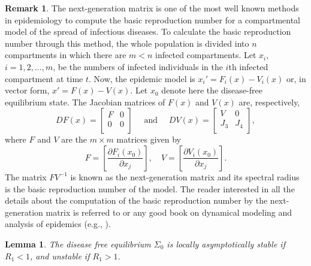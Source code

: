 \documentclass{my_aims}
\newtheorem{lemma}[theorem]{Lemma}
\theoremstyle{definition}
\newtheorem{remark}{Remark}
\begin{document}
\begin{remark}
\label{rem3}
The next-generation matrix is one of the most well known methods in epidemiology
to compute the basic reproduction number for a compartmental model
of the spread of infectious diseases. To calculate the basic reproduction number
through this method, the whole population is divided into $n$ compartments
in which there are $m<n$ infected compartments. Let $x_i$, $i=1,2,\ldots,m$,
be the numbers of infected individuals in the $i$th infected compartment at time $t$.
Now, the epidemic model is $x_i' = F_i(x) - V_i(x)$ or, in vector form,
$x' = F(x) - V(x)$. Let $x_0$ denote here the disease-free equilibrium state.
The Jacobian matrices of $F(x)$ and $V(x)$ are, respectively,
$$
DF(x) = \left[
\begin{array}{cc}
F & 0 \\
0 & 0 \\
\end{array}
\right]
\quad \text{ and } \quad
DV(x) = \left[
\begin{array}{cc}
V & 0 \\
J_3 & J_4 \\
\end{array}
\right],
$$
where $F$ and $V$ are the $m \times m$ matrices given by
$$
F = \left[\frac{\partial F_i(x_0)}{\partial x_j}\right],
\quad
V = \left[\frac{\partial V_i(x_0)}{\partial x_j}\right].
$$
The matrix $F V^{-1}$ is known as the next-generation matrix
and its spectral radius is the basic reproduction number of the model.
The reader interested in all the details about the computation of the basic reproduction
number by the next-generation matrix is referred to \cite{MR1057044,van:den:Driessche:2002}
or any good book on dynamical modeling and analysis of epidemics (e.g., \cite{MR1882991}).
\end{remark}

\begin{lemma}
The disease free equilibrium $\Sigma_0$ is locally asymptotically stable
if $R_1 < 1$, and unstable if $R_1 > 1$.
\end{lemma}
\end{document}
